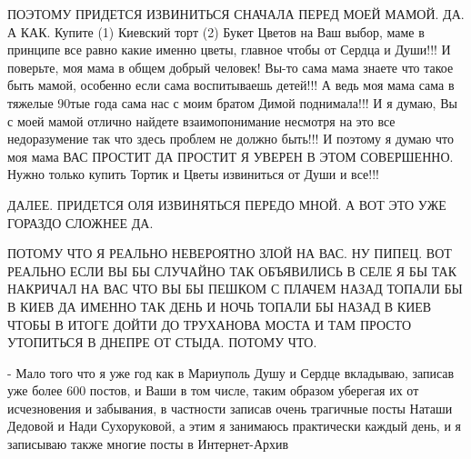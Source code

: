 ПОЭТОМУ ПРИДЕТСЯ ИЗВИНИТЬСЯ СНАЧАЛА ПЕРЕД МОЕЙ МАМОЙ. ДА. А КАК. Купите (1)
Киевский торт (2) Букет Цветов на Ваш выбор, маме в принципе все равно какие
именно цветы, главное чтобы от Сердца и Души!!! И поверьте, моя мама в общем
добрый человек!  Вы-то сама мама знаете что такое быть мамой, особенно если
сама воспитываешь детей!!!  А ведь моя мама сама в тяжелые 90тые года сама нас с моим братом
Димой поднимала!!!  И я думаю, Вы с моей мамой отлично найдете взаимопонимание
несмотря на это все недоразумение так что здесь проблем не должно быть!!!  И
поэтому я думаю что моя мама ВАС ПРОСТИТ ДА ПРОСТИТ Я УВЕРЕН В ЭТОМ СОВЕРШЕННО.
Нужно только купить Тортик и Цветы извиниться от Души и все!!!

ДАЛЕЕ. ПРИДЕТСЯ ОЛЯ ИЗВИНЯТЬСЯ ПЕРЕДО МНОЙ. А ВОТ ЭТО УЖЕ ГОРАЗДО СЛОЖНЕЕ ДА.

ПОТОМУ ЧТО Я РЕАЛЬНО НЕВЕРОЯТНО ЗЛОЙ НА ВАС. НУ ПИПЕЦ. ВОТ РЕАЛЬНО ЕСЛИ
ВЫ БЫ СЛУЧАЙНО ТАК ОБЪЯВИЛИСЬ В СЕЛЕ Я БЫ ТАК НАКРИЧАЛ НА ВАС ЧТО ВЫ БЫ ПЕШКОМ С ПЛАЧЕМ
НАЗАД ТОПАЛИ БЫ В КИЕВ ДА ИМЕННО ТАК ДЕНЬ И НОЧЬ ТОПАЛИ БЫ НАЗАД В КИЕВ ЧТОБЫ В ИТОГЕ ДОЙТИ 
ДО ТРУХАНОВА МОСТА И ТАМ ПРОСТО УТОПИТЬСЯ В ДНЕПРЕ ОТ СТЫДА. ПОТОМУ ЧТО.

- Мало того что я уже год как в Мариуполь Душу и Сердце вкладываю, записав уже более 600 постов,
и Ваши в том числе, таким образом уберегая их от исчезновения и забывания, в частности
записав очень трагичные посты Наташи Дедовой и Нади Сухоруковой, а этим я занимаюсь практически
каждый день, и я записываю также многие посты в Интернет-Архив

